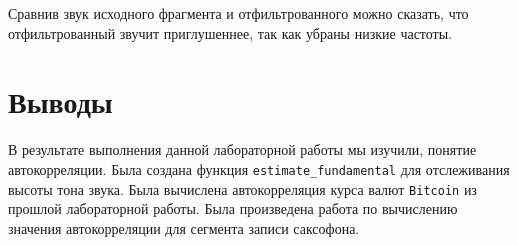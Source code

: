 \documentclass[a4paper, 14pt]{extarticle}
\begin{document}
    Сравнив звук исходного фрагмента и отфильтрованного можно сказать, что отфильтрованный звучит приглушеннее, так как убраны низкие частоты.

    \newpage


    \section{Выводы}
    \label{sec:conclusions}

    В результате выполнения данной лабораторной работы мы изучили, понятие автокорреляции.
    Была создана функция \texttt{estimate\_fundamental} для отслеживания высоты тона звука.
    Была вычислена автокорреляция курса валют \texttt{Bitcoin} из прошлой лабораторной работы.
    Была произведена работа по вычислению значения автокорреляции для сегмента записи саксофона.
\end{document}
